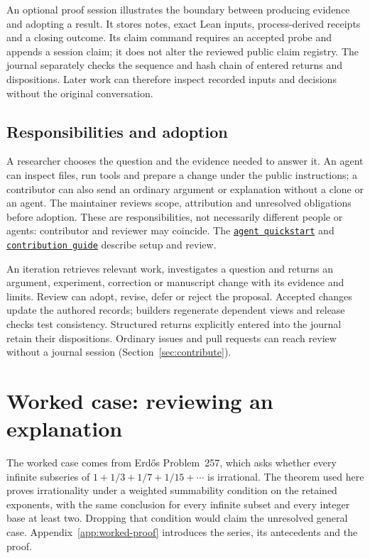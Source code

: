 \documentclass[10pt]{article}
\newcommand{\repobase}{https://github.com/wcook04/plectis-erdos}
\newcommand{\repolink}[2]{\href{\repobase/blob/992cf60a27efd8c34f437e347c413bb781d75c32/#1}{\texttt{#2}}}
\begin{document}
An optional proof session illustrates the boundary between producing evidence and adopting a result. It stores notes, exact Lean inputs, process-derived receipts and a closing outcome. Its claim command requires an accepted probe and appends a session claim; it does not alter the reviewed public claim registry. The journal separately checks the sequence and hash chain of entered returns and dispositions. Later work can therefore inspect recorded inputs and decisions without the original conversation.

\subsection{Responsibilities and adoption}
A researcher chooses the question and the evidence needed to answer it. An agent can inspect files, run tools and prepare a change under the public instructions; a contributor can also send an ordinary argument or explanation without a clone or an agent. The maintainer reviews scope, attribution and unresolved obligations before adoption. These are responsibilities, not necessarily different people or agents: contributor and reviewer may coincide. The \repolink{docs/agents/README.md}{agent quickstart} and \repolink{CONTRIBUTING.md}{contribution guide} describe setup and review.

An iteration retrieves relevant work, investigates a question and returns an argument, experiment, correction or manuscript change with its evidence and limits. Review can adopt, revise, defer or reject the proposal. Accepted changes update the authored records; builders regenerate dependent views and release checks test consistency. Structured returns explicitly entered into the journal retain their dispositions. Ordinary issues and pull requests can reach review without a journal session (Section~\ref{sec:contribute}).

\section{Worked case: reviewing an explanation}\label{sec:example}\label{sec:predigestion}


The worked case comes from Erd\H{o}s Problem~257, which asks whether every infinite subseries of $1+1/3+1/7+1/15+\cdots$ is irrational. The theorem used here proves irrationality under a weighted summability condition on the retained exponents, with the same conclusion for every infinite subset and every integer base at least two. Dropping that condition would claim the unresolved general case. Appendix~\ref{app:worked-proof} introduces the series, its antecedents and the proof.
\end{document}
